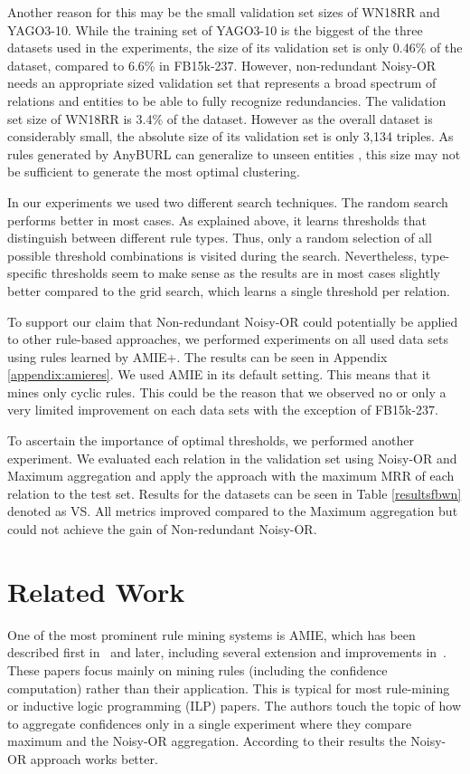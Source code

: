 \documentclass[akbc,twoside,11pt,lettersize]{article}
\begin{document}
Another reason for this may be the small validation set sizes of WN18RR and YAGO3-10. While the training set of YAGO3-10 is the biggest of the three datasets used in the experiments, the size of its validation set is only 0.46\% of the dataset, compared to 6.6\% in FB15k-237. However, non-redundant Noisy-OR needs an appropriate sized validation set that represents a broad spectrum of relations and entities to be able to fully recognize redundancies. The validation set size of WN18RR is 3.4\% of the dataset. However as the overall dataset is considerably small, the absolute size of its validation set is only 3,134 triples. As rules generated by AnyBURL can generalize to unseen entities \cite{Ferre2020}, this size may not be sufficient to generate the most optimal clustering.

In our experiments we used two different search techniques. The random search performs better in most cases. As explained above, it learns thresholds that distinguish between different rule types. Thus, only a random selection of all possible threshold combinations is visited during the search. Nevertheless, type-specific thresholds seem to make sense as the results are in most cases slightly better compared to the grid search, which learns a single threshold per relation.

To support our claim that Non-redundant Noisy-OR could potentially be applied to other rule-based approaches, we performed experiments on all used data sets using rules learned by AMIE+. The results can be seen in Appendix \ref{appendix:amieres}. We used AMIE in its default setting. This means that it mines only cyclic rules. This could be the reason that we observed no or only a very limited improvement on each data sets with the exception of FB15k-237. 

To ascertain the importance of optimal thresholds, we performed another experiment. We evaluated each relation in the validation set using Noisy-OR and Maximum aggregation and apply the approach with the maximum MRR of each relation to the test set. Results for the datasets can be seen in Table \ref{resultsfbwn} denoted as VS. All metrics improved compared to the Maximum aggregation but could not achieve the gain of Non-redundant Noisy-OR.

\section{Related Work}


One of the most prominent rule mining systems is AMIE, which has been described first in~\cite{Galarraga2015} and later, including several extension and improvements in~\cite{lajus2020fast}. These papers focus mainly on mining rules (including the confidence computation) rather than their application. This is typical for most rule-mining or inductive logic programming (ILP) papers. The authors touch the topic of how to aggregate confidences only in a single experiment where they compare maximum and the Noisy-OR aggregation. According to their results the Noisy-OR approach works better.
\end{document}
